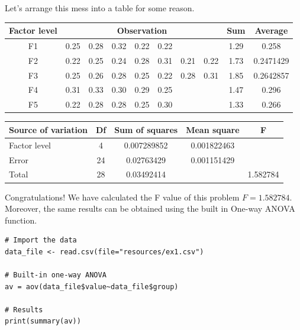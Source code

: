 \documentclass[a4paper]{article}
\numberwithin{equation}{section}
\begin{document}
Let's arrange this mess into a table for some reason.
\begin{center}
  \begin{tabular}{cccccccccc}
    \toprule
    Factor level & \multicolumn{7}{c}{Observation} & Sum  & Average                                                \\
    \midrule
    F1           & 0.25                            & 0.28 & 0.32    & 0.22 & 0.22 &      &      & 1.29 & 0.258     \\
    F2           & 0.22                            & 0.25 & 0.24    & 0.28 & 0.31 & 0.21 & 0.22 & 1.73 & 0.2471429 \\
    F3           & 0.25                            & 0.26 & 0.28    & 0.25 & 0.22 & 0.28 & 0.31 & 1.85 & 0.2642857 \\
    F4           & 0.31                            & 0.33 & 0.30    & 0.29 & 0.25 &      &      & 1.47 & 0.296     \\
    F5           & 0.22                            & 0.28 & 0.28    & 0.25 & 0.30 &      &      & 1.33 & 0.266     \\
    \bottomrule
  \end{tabular}
\end{center}
\begin{center}
  \begin{tabular}{lcccc}
    \toprule
    Source of variation & Df & Sum of squares & Mean square & F        \\
    \midrule
    Factor level        & 4  & 0.007289852    & 0.001822463 &          \\
    Error               & 24 & 0.02763429     & 0.001151429 &          \\
    Total               & 28 & 0.03492414     &             & 1.582784 \\
    \bottomrule
  \end{tabular}
\end{center}

Congratulations! We have calculated the F value of this problem \(F = 1.582784\).
Moreover, the same results can be obtained using the built in One-way ANOVA function.
\begin{mdframed}[leftline=false,rightline=false,backgroundcolor=magenta!10,nobreak=true]
  \begin{verbatim}
# Import the data
data_file <- read.csv(file="resources/ex1.csv")

# Built-in one-way ANOVA
av = aov(data_file$value~data_file$group)

# Results
print(summary(av))
  \end{verbatim}
\end{mdframed}
\end{document}

